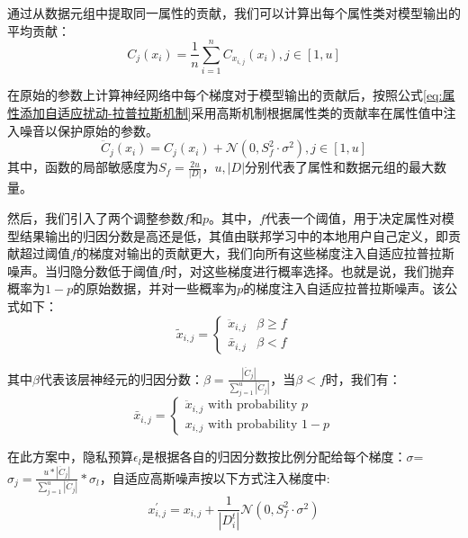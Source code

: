 通过从数据元组中提取同一属性的贡献，我们可以计算出每个属性类对模型输出的平均贡献：
\begin{equation}\label{eq:属性添加自适应扰动}
C_{j}\left(x_{i}\right)=\frac{1}{n} \sum_{i=1}^{n} C_{x_{i, j}}\left(x_{i}\right), j \in[1, u]
\end{equation}

在原始的参数上计算神经网络中每个梯度对于模型输出的贡献后，按照公式\ref{eq:属性添加自适应扰动-拉普拉斯机制}采用高斯机制根据属性类的贡献率在属性值中注入噪音以保护原始的参数。
\begin{equation}\label{eq:属性添加自适应扰动-拉普拉斯机制}
\ddot{C}_{j}\left(x_{i}\right)=C_{j}\left(x_{i}\right)+\mathcal{N}\left(0, S_{f}^{2} \cdot \sigma^{2}\right), j \in[1, u]
\end{equation}
其中，函数的局部敏感度为$S_{f}=\frac{2 u}{|D|}$，$u,|D|$分别代表了属性和数据元组的最大数量。

然后，我们引入了两个调整参数$f$和$p$。其中，$f$代表一个阈值，用于决定属性对模型结果输出的归因分数是高还是低，其值由联邦学习中的本地用户自己定义，即贡献超过阈值$f$的梯度对输出的贡献更大，我们向所有这些梯度注入自适应拉普拉斯噪声。当归隐分数低于阈值$f$时，对这些梯度进行概率选择。也就是说，我们抛弃概率为$1-p$的原始数据，并对一些概率为$p$的梯度注入自适应拉普拉斯噪声。该公式如下：
\begin{equation}\label{eq:神经网络加噪}
\tilde{x}_{i, j}=\left\{\begin{array}{ll}
\ddot{x}_{i, j} & \beta \geq f \\
\bar{x}_{i, j} & \beta<f
\end{array}\right.
\end{equation}

其中$\beta$代表该层神经元的归因分数：$\beta=\frac{\left|\ddot{C}_{j}\right|}{\sum_{j=1}^{u}\left|\ddot{C}_{j}\right|}$，当$\beta<f$时，我们有：
\begin{equation}\label{eq:神经网络加噪2}
\bar{x}_{i, j}=\left\{\begin{array}{l}
\ddot{x}_{i, j} \text { with probability } p \\
x_{i, j} \text { with probability } 1-p
\end{array}\right.
\end{equation}

在此方案中，隐私预算$\epsilon_{l}$是根据各自的归因分数按比例分配给每个梯度：$\sigma$=$\sigma_{j}=\frac{u *\left|\ddot{C}_{j}\right|}{\sum_{j=1}^{u}\left|\ddot{C}_{j}\right|} * \sigma_{l}$，自适应高斯噪声按以下方式注入梯度中:
\begin{equation}\label{eq:神经网络加噪3}
x_{i, j}^{\prime}=x_{i, j}+\frac{1}{\left|D_{i}^{t}\right|}\mathcal{N}\left(0, S_{f}^{2} \cdot \sigma^{2}\right)
\end{equation}

